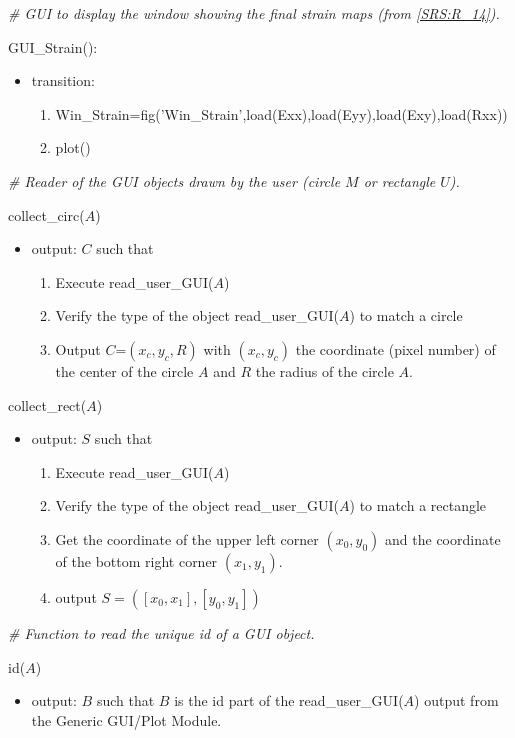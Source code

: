 \documentclass[12pt, titlepage]{article}
\begin{document}
\noindent\textit{{\#} GUI to display the window showing the final strain maps 
(from \cref{SRS:R_14}).}\medskip

\noindent GUI{\_}Strain():
\begin{itemize}
\item transition: 
	\begin{enumerate}
	\item 
Win{\_}Strain=fig('Win{\_}Strain',load(Exx),load(Eyy),load(Exy),load(Rxx))
	\item plot()
	\end{enumerate} 
\end{itemize}
\bigskip


\noindent\textit{{\#} Reader of the GUI objects drawn by the user (circle $M$ or 
rectangle $U$).} \medskip

\noindent collect{\_}circ($A$)
\begin{itemize}
\item output: $C$ such that
	\begin{enumerate}
	\item Execute read{\_}user{\_}GUI($A$)
	\item Verify the type of the object read{\_}user{\_}GUI($A$) to match a circle
	\item Output $C$=$(x_c,y_c,R)$ with $(x_c,y_c)$ the coordinate (pixel number) 
of the center of the circle $A$ and $R$ the radius of the circle $A$.
	\end{enumerate} 
\end{itemize}
\bigskip

\noindent collect{\_}rect($A$)
\begin{itemize}
\item output: $S$ such that
	\begin{enumerate}
	\item Execute read{\_}user{\_}GUI($A$)
	\item Verify the type of the object read{\_}user{\_}GUI($A$) to match a 
rectangle
	\item Get the coordinate of the upper left corner $(x_0,y_0)$ and the 
coordinate of the bottom right corner $(x_1,y_1)$. 
	\item output $S=([x_0,x_1],[y_0,y_1])$
	\end{enumerate} 
\end{itemize}
\bigskip

\noindent\textit{{\#} Function to read the unique id of a GUI object.} \medskip

\noindent id($A$)
\begin{itemize}
\item output: $B$ such that $B$ is the id part of the read{\_}user{\_}GUI($A$) 
output from the Generic GUI/Plot Module.
\end{itemize}
\bigskip
\end{document}
